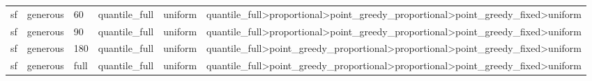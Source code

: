 \begin{tabular}{llllll}
sf & generous & 60 & quantile\_full & uniform & quantile\_full>proportional>point\_greedy\_proportional>point\_greedy\_fixed>uniform \\
sf & generous & 90 & quantile\_full & uniform & quantile\_full>proportional>point\_greedy\_proportional>point\_greedy\_fixed>uniform \\
sf & generous & 180 & quantile\_full & uniform & quantile\_full>point\_greedy\_proportional>proportional>point\_greedy\_fixed>uniform \\
sf & generous & full & quantile\_full & uniform & quantile\_full>point\_greedy\_proportional>proportional>point\_greedy\_fixed>uniform \\
\bottomrule
\end{tabular}
